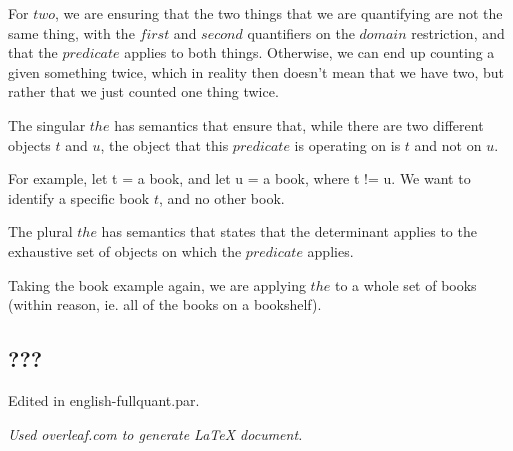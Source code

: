 \documentclass[12pt, letterpaper]{article}
\begin{document}

For $two$, we are ensuring that the two things that we are quantifying are not the same thing, with the $first$ and $second$ quantifiers on the $domain$ restriction, and that the $predicate$ applies to both things. Otherwise, we can end up counting a given something twice, which in reality then doesn't mean that we have two, but rather that we just counted one thing twice. 


The singular $the$ has semantics that ensure that, while there are two different objects $t$ and $u$, the object that this $predicate$ is operating on is $t$ and not on $u$. 

For example, let t = a book, and let u = a book, where t != u. We want to identify a specific book $t$, and no other book. 


The plural $the$ has semantics that states that the determinant applies to the exhaustive set of objects on which the $predicate$ applies.

Taking the book example again, we are applying $the$ to a whole set of books (within reason, ie. all of the books on a bookshelf). 

\subsection{???}
Edited in english-fullquant.par.

\begin{center}
\textit{Used overleaf.com to generate LaTeX document.}
\end{center}
\end{document}
